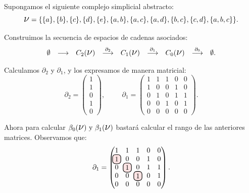 \documentclass[12pt, a4paper, twoside]{book}
\newcommand\hlightr[1]{\tikz[overlay, remember picture,baseline=-
\the\dimexpr\fontdimen22\textfont2\relax]\node[rectangle,fill=red!50,rounded 
corners,fill opacity = 0.2,draw,thick,text opacity =1] {$#1$};}
\numberwithin{equation}{section}
\theoremstyle{definition}
\newenvironment{ejem}
  {\pushQED{\qed}\renewcommand{\qedsymbol}{$\blacktriangleleft$}\ejemplo}
  {\popQED\endejemplo}
\theoremstyle{remark}
\theoremstyle{plain}
\begin{document}
	\begin{ejem}
		Supongamos el siguiente complejo simplicial abstracto:
		\begin{equation*} 
			\text{{\Large $\nu$}}=\{\{a\},\{b\},\{c\},\{d\},\{e\},
			\{a,b\},\{a,c\},\{a,d\},\{b,c\},\{c,d\},\{a,b,c\}\}.
		\end{equation*}

		Construimos la secuencia de espacios de cadenas asociados:
		\begin{equation*}
			 \left.
			\begin{array}{ccccccccc}
				\emptyset & 
				\longrightarrow & C_{2}(
				\text{{\Large $\nu$}}) & 
				\overset{\partial_{2}}{
				\longrightarrow} & C_{1}(\text{{\Large $\nu$}}) 
						& \overset{\partial_{1}}{
				\longrightarrow} 
				& C_{0}(\text{{\Large $\nu$}}) & 
				\overset{\partial_{0}}{
				\longrightarrow} & \emptyset. 
			\end{array}
			\right. 
		\end{equation*}

		Calculamos $\partial_{2}$ y $\partial_{1}$, y los expresamos 
		de manera matricial:
		\begin{equation*}
			\partial_{2}=
			\begin{pmatrix}
			1 \\
			1 \\
			0 \\
			1 \\
			0
			\end{pmatrix},
			\hspace{1cm}
			\partial_{1}=
			\begin{pmatrix}
			1 & 1 & 1 & 0 & 0\\
			1 & 0 & 0 & 1 & 0\\
			0 & 1 & 0 & 1 & 1\\
			0 & 0 & 1 & 0 & 1\\
			0 & 0 & 0 & 0 & 0
			\end{pmatrix}.
		\end{equation*}

		Ahora para calcular $\beta_{0}(\text{{\Large $\nu$}}) 
		\text{ y } \beta_{1}(\text{{\Large $\nu$}})$ bastará
		calcular el rango de las anteriores matrices. Observamos que:
		\begin{equation*}
			\partial_{1}=
			\begin{pmatrix}
			1 & 1 & 1 & 0 & 0\\
			\hlightr{1} & 0 & 0 & 1 & 0\\
			0 & \hlightr{1} & 0 & 1 & 1\\
			0 & 0 & \hlightr{1} & 0 & 1\\
			0 & 0 & 0 & 0 & 0
			\end{pmatrix}.
		\end{equation*}


\end{ejem}
\end{document}
